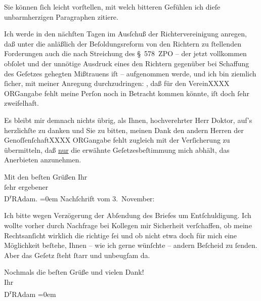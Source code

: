 \pstart
           Sie können ſich leicht vorſtellen, mit welch bitteren Gefühlen ich dieſe
               unbarmherzigen Paragraphen zitiere.\pend
           
\pstart
           Ich werde in den nächſten Tagen im Ausſchuß der Richtervereinigung anregen, daß unter die anläßlich der Beſoldungsreform von
               den Richtern zu ſtellenden Forderungen auch die nach Streichung des § 578 ZPO – der
               jetzt vollkommen obſolet und der unnötige Ausdruck eines den Richtern gegenüber bei
               Schaffung des Geſetzes gehegten Mißtrauens iſt – aufgenommen werde, und ich bin
               ziemlich ſicher, mit meiner Anregung durchzudringen: \label{K_L02357-1v}\label{K_L02357-1}, daß für den VereinXXXX ORGangabe fehlt meine Perſon noch in Betracht kommen
               könnte, iſt doch ſehr zweifelhaft.\pend
           
\pstart
           {\pb}Es bleibt mir demnach nichts übrig, als
               Ihnen, hochverehrter Herr Doktor, auf’s herzlichſte zu danken und Sie zu bitten,
               meinen Dank den andern Herren der GenoſſenſchaftXXXX ORGangabe fehlt zugleich mit der Verſicherung zu übermitteln, daß \uline{nur} die erwähnte Geſetzesbeſtimmung mich abhält, das
               Anerbieten anzunehmen.\pend
           
\pstart
           Mit den beſten Grüßen Ihr{\\[\baselineskip]}ſehr ergebener{\\[\baselineskip]}\spacefill\mbox{D\textsuperscript{r}RAdam.}\pend
           \leftskip=0em{}\vspace{1em}
\pstart
           \noindent{}Nachſchrift vom 3. November:\pend
           
\pstart
           Ich bitte wegen Verzögerung der Abſendung des Briefes um Entſchuldigung. Ich wollte
               vorher durch Nachfrage bei Kollegen mir Sicherheit verſchaffen, ob meine
               Rechtsanſicht wirklich die richtige ſei und ob nicht etwa doch für mich eine
               Möglichkeit beſtehe, Ihnen – wie ich gerne wünſchte – andern Beſcheid zu ſenden. Aber
                  {\pb}das Geſetz ſteht ſtarr und unbeugſam
               da.\pend
           
\pstart
           Nochmals die beſten Grüße und vielen Dank!{\\[\baselineskip]}Ihr{\\[\baselineskip]}\spacefill\mbox{D\textsuperscript{r}RAdam}\pend
           \leftskip=0em{}\endnumbering{}  
      